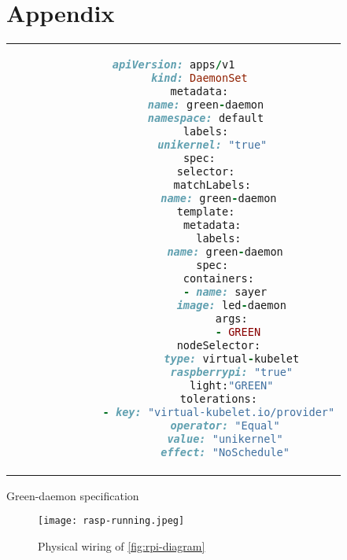 \chapter{Appendix} \label{chapter: Appendix}

\begin{code}[htpb]
    \centering
    \begin{tabular}{c}
    \begin{lstlisting}[language=ruby]
        apiVersion: apps/v1
        kind: DaemonSet
        metadata:
          name: green-daemon
          namespace: default
          labels:
            unikernel: "true"
        spec:
          selector:
            matchLabels:
              name: green-daemon
          template:
            metadata:
              labels:
                name: green-daemon
            spec:
              containers:
                - name: sayer
                  image: led-daemon
                  args:
                    - GREEN
              nodeSelector:
                  type: virtual-kubelet
                  raspberrypi: "true"
                  light:"GREEN"
              tolerations:
              - key: "virtual-kubelet.io/provider"
                operator: "Equal"
                value: "unikernel"
                effect: "NoSchedule"
  \end{lstlisting}
  \end{tabular}
  \caption{Green-daemon specification}\label{fig:green-daemon}
  \end{code}


  \begin{figure}
    \centering
    \texttt{[image: rasp-running.jpeg]}
    \caption{Physical wiring of \ref{fig:rpi-diagram}}
  \end{figure}
  